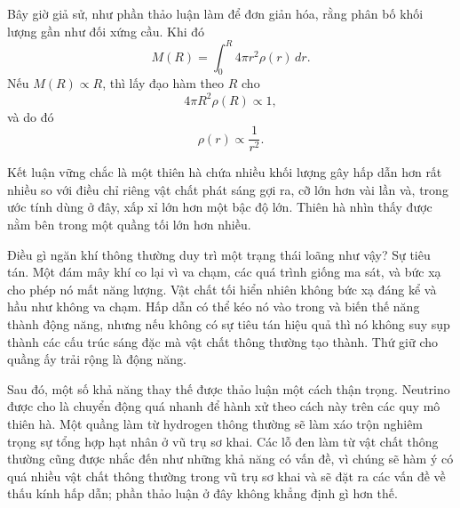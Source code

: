 Bây giờ giả sử, như phần thảo luận làm để đơn giản hóa, rằng phân bố khối lượng gần như đối xứng cầu. Khi đó
\begin{equation}
M(R)=\int_0^R 4\pi r^2\rho(r)\,dr.
\end{equation}
Nếu \(M(R)\propto R\), thì lấy đạo hàm theo \(R\) cho
\begin{equation}
4\pi R^2\rho(R)\propto 1,
\end{equation}
và do đó
\begin{equation}
\rho(r)\propto \frac{1}{r^2}.
\end{equation}

\begin{classroomqa}
\end{classroomqa}

Kết luận vững chắc là một thiên hà chứa nhiều khối lượng gây hấp dẫn hơn rất nhiều so với điều chỉ riêng vật chất phát sáng gợi ra, cỡ lớn hơn vài lần và, trong ước tính dùng ở đây, xấp xỉ lớn hơn một bậc độ lớn. Thiên hà nhìn thấy được nằm bên trong một quầng tối lớn hơn nhiều.

Điều gì ngăn khí thông thường duy trì một trạng thái loãng như vậy? Sự tiêu tán. Một đám mây khí co lại vì va chạm, các quá trình giống ma sát, và bức xạ cho phép nó mất năng lượng. Vật chất tối hiển nhiên không bức xạ đáng kể và hầu như không va chạm. Hấp dẫn có thể kéo nó vào trong và biến thế năng thành động năng, nhưng nếu không có sự tiêu tán hiệu quả thì nó không suy sụp thành các cấu trúc sáng đặc mà vật chất thông thường tạo thành. Thứ giữ cho quầng ấy trải rộng là động năng.

Sau đó, một số khả năng thay thế được thảo luận một cách thận trọng. Neutrino được cho là chuyển động quá nhanh để hành xử theo cách này trên các quy mô thiên hà. Một quầng làm từ hydrogen thông thường sẽ làm xáo trộn nghiêm trọng sự tổng hợp hạt nhân ở vũ trụ sơ khai. Các lỗ đen làm từ vật chất thông thường cũng được nhắc đến như những khả năng có vấn đề, vì chúng sẽ hàm ý có quá nhiều vật chất thông thường trong vũ trụ sơ khai và sẽ đặt ra các vấn đề về thấu kính hấp dẫn; phần thảo luận ở đây không khẳng định gì hơn thế.

